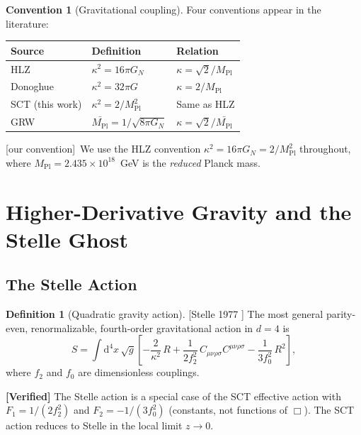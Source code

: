\documentclass[11pt,a4paper]{article}
\theoremstyle{plain}
\theoremstyle{definition}
\newtheorem{definition}[theorem]{Definition}
\newtheorem{convention}[theorem]{Convention}
\theoremstyle{remark}
\newcommand{\Rsq}{R^2}
\newcommand{\Weylsq}{C_{\mu\nu\rho\sigma}C^{\mu\nu\rho\sigma}}
\newcommand{\dd}{\mathrm{d}}
\newcommand{\MPl}{M_{\mathrm{Pl}}}
\newcommand{\fromlit}[1]{\textcolor{blue!70!black}{\textsf{[#1]}}}
\newcommand{\oursign}{\textcolor{teal!80!black}{\textsf{[our convention]}}}
\newcommand{\verified}[1]{%
  \par\smallskip\noindent
  \colorbox{green!10}{\parbox{\dimexpr\linewidth-2\fboxsep}{%
    \textcolor{green!50!black}{\textbf{[Verified]}} #1}}%
  \par\smallskip}
\begin{document}
\begin{convention}[Gravitational coupling]
\label{conv:coupling}
Four conventions appear in the literature:
\begin{center}
\begin{tabular}{lll}
\toprule
Source & Definition & Relation \\
\midrule
HLZ \cite{HLZ1999} & $\kappa^2 = 16\pi G_N$ & $\kappa = \sqrt{2}/\MPl$ \\
Donoghue \cite{Donoghue2019} & $\kappa^2 = 32\pi G$ & $\kappa = 2/\MPl$ \\
SCT (this work) & $\kappa^2 = 2/\MPl^2$ & Same as HLZ \\
GRW \cite{GRW1999} & $\bar{\MPl} = 1/\sqrt{8\pi G_N}$ & $\kappa = \sqrt{2}/\bar{\MPl}$ \\
\bottomrule
\end{tabular}
\end{center}
\oursign\ We use the HLZ convention $\kappa^2 = 16\pi G_N = 2/\MPl^2$
throughout, where $\MPl = 2.435 \times 10^{18}$~GeV is the
\emph{reduced} Planck mass.
\end{convention}


\section{Higher-Derivative Gravity and the Stelle Ghost}
\label{sec:stelle}

\subsection{The Stelle Action}

\begin{definition}[Quadratic gravity action]
\label{def:stelle-action}
\fromlit{Stelle 1977 \cite{Stelle1977}}
The most general parity-even, renormalizable, fourth-order gravitational
action in $d = 4$ is
\begin{equation}\label{eq:stelle-action}
  S = \int \dd^4 x\,\sqrt{g}\left[
    -\frac{2}{\kappa^2}\,R
    + \frac{1}{2f_2^2}\,\Weylsq
    - \frac{1}{3f_0^2}\,\Rsq
  \right],
\end{equation}
where $f_2$ and $f_0$ are dimensionless couplings.
\end{definition}

\verified{The Stelle action is a special case of the SCT effective action
with $F_1 = 1/(2f_2^2)$ and $F_2 = -1/(3f_0^2)$ (constants, not functions
of $\Box$).  The SCT action reduces to Stelle in the local limit
$z \to 0$.}
\end{document}
